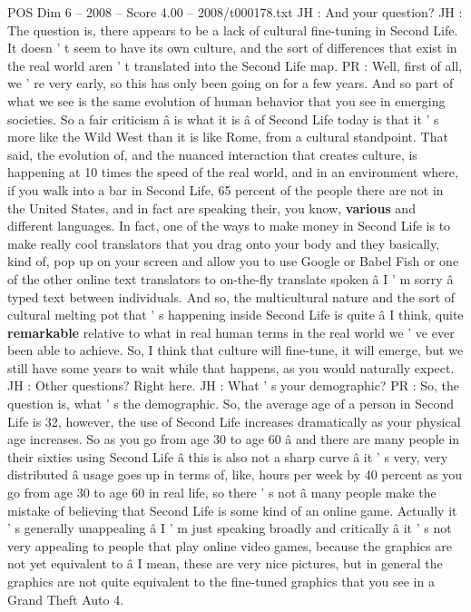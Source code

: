 \begin{textsample}{POS Dim 6 – 2008 – Score 4.00 – 2008/t000178.txt}
JH : And your question?
JH : The question is, there appears to be a lack of cultural fine-tuning in Second Life.
It doesn ' t seem to have its own culture, and the sort of differences that exist in the real world aren ' t translated into the Second Life map.
PR : Well, first of all, we ' re very early, so this has only been going on for a few years.
And so part of what we see is the same evolution of human behavior that you see in emerging societies.
So a fair criticism â is what it is â of Second Life today is that it ' s more like the Wild West than it is like Rome, from a cultural standpoint.
That said, the evolution of, and the nuanced interaction that creates culture, is happening at 10 times the speed of the real world, and in an environment where, if you walk into a bar in Second Life, 65 percent of the people there are not in the United States, and in fact are speaking their, you know, \textbf{various} and different languages.
In fact, one of the ways to make money in Second Life is to make really cool translators that you drag onto your body and they basically, kind of, pop up on your screen and allow you to use Google or Babel Fish or one of the other online text translators to on-the-fly translate spoken â I ' m sorry â typed text between individuals.
And so, the multicultural nature and the sort of cultural melting pot that ' s happening inside Second Life is quite â I think, quite \textbf{remarkable} relative to what in real human terms in the real world we ' ve ever been able to achieve.
So, I think that culture will fine-tune, it will emerge, but we still have some years to wait while that happens, as you would naturally expect.
JH : Other questions?
Right here.
JH : What ' s your demographic?
PR : So, the question is, what ' s the demographic.
So, the average age of a person in Second Life is 32, however, the use of Second Life increases dramatically as your physical age increases.
So as you go from age 30 to age 60 â and there are many people in their sixties using Second Life â this is also not a sharp curve â it ' s very, very distributed â usage goes up in terms of, like, hours per week by 40 percent as you go from age 30 to age 60 in real life, so there ' s not â many people make the mistake of believing that Second Life is some kind of an online game.
Actually it ' s generally unappealing â I ' m just speaking broadly and critically â it ' s not very appealing to people that play online video games, because the graphics are not yet equivalent to â I mean, these are very nice pictures, but in general the graphics are not quite equivalent to the fine-tuned graphics that you see in a Grand Theft Auto 4.

\end{textsample}

